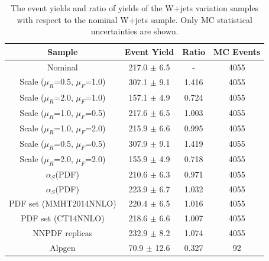 \begin{table}[htbp!]
\begin{center}
\begin{tabular}{c|c|c||c}
Sample     & Event Yield & Ratio & MC Events \\ 
\hline
Nominal                              & 217.0 $\pm$ 6.5 & -     & 4055 \\
Scale ($\mu_{R}$=0.5, $\mu_{F}$=1.0) & 307.1 $\pm$ 9.1 & 1.416 & 4055 \\
Scale ($\mu_{R}$=2.0, $\mu_{F}$=1.0) & 157.1 $\pm$ 4.9 & 0.724 & 4055 \\
Scale ($\mu_{R}$=1.0, $\mu_{F}$=0.5) & 217.6 $\pm$ 6.5 & 1.003 & 4055 \\
Scale ($\mu_{R}$=1.0, $\mu_{F}$=2.0) & 215.9 $\pm$ 6.6 & 0.995 & 4055 \\
Scale ($\mu_{R}$=0.5, $\mu_{F}$=0.5) & 307.9 $\pm$ 9.1 & 1.419 & 4055 \\
Scale ($\mu_{R}$=2.0, $\mu_{F}$=2.0) & 155.9 $\pm$ 4.9 & 0.718 & 4055 \\
$\alpha_{S}$(PDF)                    & 210.6 $\pm$ 6.3 & 0.971 & 4055 \\
$\alpha_{S}$(PDF)                    & 223.9 $\pm$ 6.7 & 1.032 & 4055 \\
PDF set (MMHT2014NNLO)               & 220.4 $\pm$ 6.5 & 1.016 & 4055 \\
PDF set (CT14NNLO)                   & 218.6 $\pm$ 6.6 & 1.007 & 4055 \\
NNPDF replicas                       & 232.9 $\pm$ 8.2 & 1.074 & 4055 \\
Alpgen                               & 70.9  $\pm$ 12.6& 0.327 & 92   \\
\end{tabular}
\end{center}
\caption{The event yields and ratio of yields of the W+jets variation samples
with respect to the nominal W+jets sample. Only MC statistical uncertainties are shown.} 
\label{tab:boosted_systematics_wjets_yields}
\end{table}

